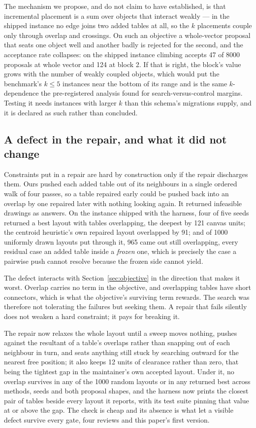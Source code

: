 \documentclass[11pt]{article}
\begin{document}
The mechanism we propose, and do not claim to have established, is that incremental placement
is a sum over objects that interact weakly --- in the shipped instance no edge joins two added
tables at all, so the $k$ placements couple only through overlap and crossings. On such an
objective a whole-vector proposal that seats one object well and another badly is rejected for
the second, and the acceptance rate collapses: on the shipped instance climbing accepts 47 of
8000 proposals at whole vector and 124 at block 2. If that is right, the block's value grows
with the number of weakly coupled objects, which would put the benchmark's $k \le 5$
instances near the bottom of its range and is the same $k$-dependence the pre-registered
analysis found for search-versus-control margins. Testing it needs instances with larger $k$
than this schema's migrations supply, and it is declared as such rather than concluded.


\subsection{A defect in the repair, and what it did not change}\label{sec:repair}

Constraints put in a repair are hard by construction only if the repair discharges them. Ours
pushed each added table out of its neighbours in a single ordered walk of four passes, so a
table repaired early could be pushed back into an overlap by one repaired later with nothing
looking again. It returned infeasible drawings as answers. On the instance shipped with the
harness, four of five seeds returned a best layout with tables overlapping, the deepest by 121
canvas units; the centroid heuristic's own repaired layout overlapped by 91; and of 1000
uniformly drawn layouts put through it, 965 came out still overlapping, every residual case an
added table inside a \emph{frozen} one, which is precisely the case a pairwise push cannot
resolve because the frozen side cannot yield.

The defect interacts with Section~\ref{sec:objective} in the direction that makes it worst.
Overlap carries no term in the objective, and overlapping tables have short connectors, which
is what the objective's surviving term rewards. The search was therefore not tolerating the
failures but seeking them. A repair that fails silently does not weaken a hard constraint; it
pays for breaking it.

The repair now relaxes the whole layout until a sweep moves nothing, pushes against the
resultant of a table's overlaps rather than snapping out of each neighbour in turn, and seats
anything still stuck by searching outward for the nearest free position; it also keeps 12
units of clearance rather than zero, that being the tightest gap in the maintainer's own
accepted layout. Under it, no overlap survives in any of the 1000 random layouts or in any
returned best across methods, seeds and both proposal shapes, and the harness now prints the
closest pair of tables beside every layout it reports, with its test suite pinning that value
at or above the gap. The check is cheap and its absence is what let a visible defect survive
every gate, four reviews and this paper's first version.
\end{document}
